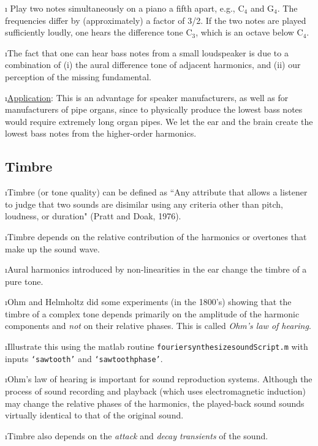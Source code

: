\i \ex
Play two notes simultaneously on a piano 
a fifth apart, e.g., C${}_4$ and G${}_4$.
The frequencies differ by (approximately) a factor of 3/2.
If the two notes are played sufficiently loudly,
one hears the difference tone C${}_3$, which is an octave 
below C${}_4$.

\i The fact that one can hear bass notes from a 
small loudspeaker is due to a combination of 
(i) the aural difference tone of adjacent harmonics, and 
(ii) our perception of the missing fundamental.

\i \underline{Application}:
This is an advantage for speaker manufacturers, 
as well as for manufacturers of pipe organs,
since to physically produce the lowest bass
notes would require extremely long organ pipes.
We let the ear and the brain create the lowest
bass notes from the higher-order harmonics.

\ei
\subsection{Timbre}

\bi
\i Timbre (or tone quality) can be defined as 
``Any attribute that allows a listener to
judge that two sounds are disimilar using any criteria
other than pitch, loudness, or duration" (Pratt and Doak, 1976).

\i Timbre depends on the relative contribution
of the harmonics or overtones that make up the sound wave.

\i Aural harmonics introduced by non-linearities
in the ear change the timbre of a pure tone.

\i Ohm and Helmholtz did some experiments (in the 1800's)
showing that the timbre of a complex tone 
depends primarily on the amplitude of the harmonic
components and {\em not} on their relative phases.
This is called {\em Ohm's law of hearing}.

\i \demo Illustrate this using the matlab routine
{\tt fouriersynthesizesoundScript.m} with inputs
{\tt `sawtooth'} and {\tt `sawtoothphase'}.
 
\i Ohm's law of hearing is important for sound reproduction 
systems.
Although the process of sound recording and playback 
(which uses electromagnetic induction)
may change the relative phases of the harmonics, 
the played-back sound sounds virtually identical to that 
of the original sound.

\i Timbre also depends on the {\em attack} and 
{\em decay transients} of the sound.

